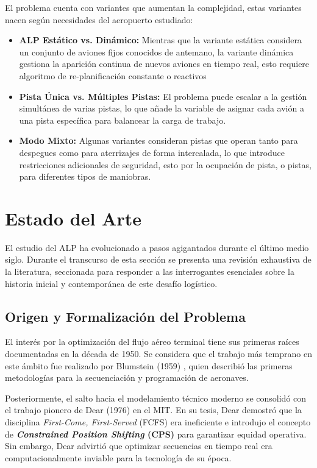 \documentclass[letter, 10pt]{article}
\begin{document}
El problema cuenta con variantes que aumentan la complejidad, estas variantes nacen seg\'un necesidades del aeropuerto estudiado:
\begin{itemize}
    \item \textbf{ALP Est\'atico vs. Din\'amico:} Mientras que la variante est\'atica considera un conjunto de aviones fijos conocidos de antemano\cite{beasley2000}, la variante din\'amica gestiona la aparici\'on continua de nuevos aviones en tiempo real, esto requiere algoritmo de re-planificaci\'on constante o reactivos \cite{ikli2021}
    \item \textbf{Pista \'Unica vs. M\'ultiples Pistas:} El problema puede escalar a la gesti\'on simult\'anea de varias pistas, lo que a\~nade la variable de asignar cada avi\'on a una pista espec\'ifica para balancear la carga de trabajo\cite{beasley2000}.
    \item \textbf{Modo Mixto:} Algunas variantes consideran pistas que operan tanto para despegues como para aterrizajes de forma intercalada, lo que introduce restricciones adicionales de seguridad, esto por la ocupaci\'on de pista, o pistas, para diferentes tipos de maniobras\cite{bennell2011}.
\end{itemize}

\newpage

\section{Estado del Arte}
El estudio del ALP ha evolucionado a pasos agigantados durante el \'ultimo medio siglo. Durante el transcurso de esta secci\'on se presenta una revisi\'on exhaustiva de la literatura, seccionada para responder a las interrogantes esenciales sobre la historia inicial y contempor\'anea de este desaf\'io log\'istico.

\subsection{Origen y Formalizaci\'on del Problema}
El inter\'es por la optimizaci\'on del flujo a\'ereo terminal tiene sus primeras ra\'ices documentadas en la d\'ecada de 1950. Se considera que el trabajo m\'as temprano en este \'ambito fue realizado por Blumstein (1959) \cite{blumstein1959}, quien describi\'o las primeras metodolog\'ias para la secuenciaci\'on y programaci\'on de aeronaves. 

Posteriormente, el salto hacia el modelamiento t\'ecnico moderno se consolid\'o con el trabajo pionero de Dear (1976) \cite{dear1976} en el MIT. En su tesis, Dear demostr\'o que la disciplina \textit{First-Come, First-Served} (FCFS) era ineficiente e introdujo el concepto de \textbf{\textit{Constrained Position Shifting} (CPS)} para garantizar equidad operativa. Sin embargo, Dear advirti\'o que optimizar secuencias en tiempo real era computacionalmente inviable para la tecnolog\'ia de su \'epoca.
\end{document}
